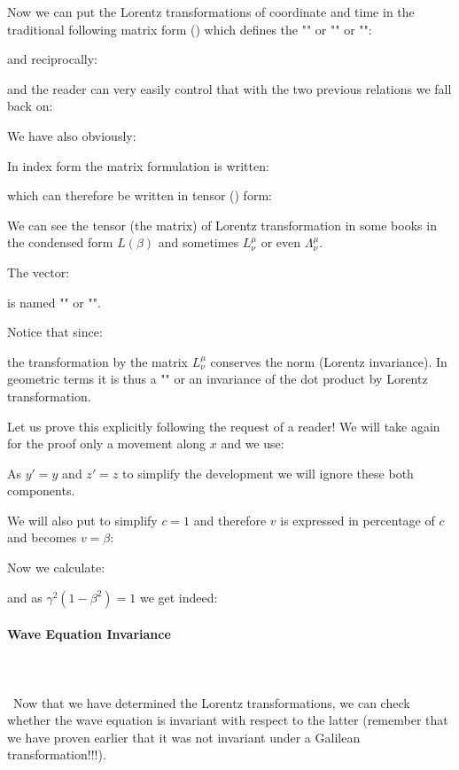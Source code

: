 	Now we can put the Lorentz transformations of coordinate and time in the traditional following matrix form () which defines the "" or "" or "\label{lorentz boost tensor}":
	
	and reciprocally:
	
	and the reader can very easily control that with the two previous relations we fall back on:
	
	We have also obviously:
	
	In index form the matrix formulation is written:
	
	which can therefore be written in tensor () form:
	
	\begin{tcolorbox}[title=Remark,colframe=black,arc=10pt]
	We can see the tensor (the matrix) of Lorentz transformation in some books in the condensed form $L(\beta)$ and sometimes $L_\nu^\mu$ or even $\Lambda_\nu^\mu$.
	\end{tcolorbox}
	The vector\label{four-vector displacement}:
	
	is named "" or "".
	
	Notice that since:
	
	the transformation by the matrix $L_\nu^\mu$ conserves the norm (Lorentz invariance\label{lorentz invariance}). In geometric terms it is thus a "" or an invariance of the dot product by Lorentz transformation.
	
	Let us prove this explicitly following the request of a reader! We will take again for the proof only a movement along $x$ and we use:
	
	As $y'=y$ and $z'=z$ to simplify the development we will ignore these both components.
	
	We will also put to simplify $c=1$ and therefore $v$ is expressed in percentage of $c$ and becomes $v=\beta$:
	
	Now we calculate:
	
	and as $\gamma^2(1-\beta^2)=1$ we get indeed:
	
	
	\paragraph{Wave Equation Invariance}\mbox{}\\\\\
	Now that we have determined the Lorentz transformations, we can check whether the wave equation is invariant with respect to the latter (remember that we have proven earlier that it was not invariant under a Galilean transformation!!!).
	
